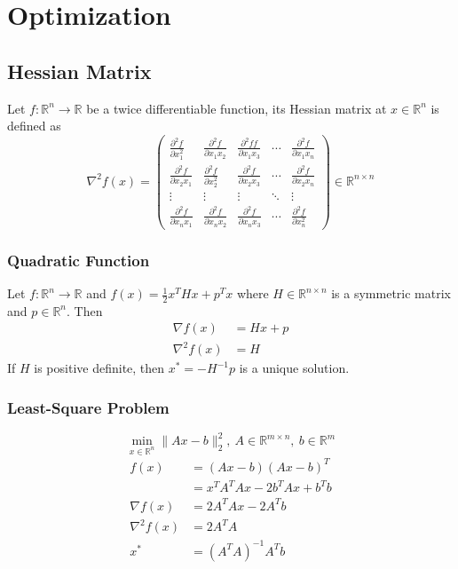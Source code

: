 \documentclass{article}
\begin{document}
    \section{Optimization}
        \subsection{Hessian Matrix}
            Let $f:\mathbb{R}^n\rightarrow\mathbb{R}$ be a twice differentiable function, its Hessian matrix at $x\in\mathbb{R}^n$ is defined as
            \[
                \nabla^2f(x)=
                \begin{pmatrix}
                    \frac{\partial^2 f}{\partial x_1^2} & \frac{\partial^2 f}{\partial x_1x_2} & \frac{\partial^2ff}{\partial x_1x_3}&\cdots&\frac{\partial^2 f}{\partial x_1x_n}\\[0.2cm]
                    \frac{\partial^2 f}{\partial x_2x_1} & \frac{\partial^2 f}{\partial x_2^2} & \frac{\partial^2 f}{\partial x_2x_3} & \cdots & \frac{\partial^2 f}{\partial x_2x_n}\\[0.2cm]
                    \vdots & \vdots &\vdots & \ddots &\vdots\\[0.2cm]
                    \frac{\partial^2 f}{\partial x_nx_1} & \frac{\partial^2 f}{\partial x_nx_2} & \frac{\partial^2 f}{\partial x_nx_3} & \cdots & \frac{\partial^2 f}{\partial x_n^2}
                \end{pmatrix}
                \in\mathbb{R}^{n \times n}
            \]
            \subsubsection{Quadratic Function}
                Let $f:\mathbb{R}^n\rightarrow\mathbb{R}$ and $f(x)=\frac{1}{2}x^THx+p^Tx$ where $H \in \mathbb{R}^{n \times n}$ is a symmetric matrix and $p \in \mathbb{R}^n$. Then
                \begin{align*}
                    \nabla f(x) &= Hx+p \\
                    \nabla^2 f(x) &= H
                \end{align*}
                If $H$ is positive definite, then $x^*=-H^{-1}p$ is a unique solution.
            
            \subsubsection{Least-Square Problem}
                \[
                    \min_{x \in \mathbb{R}^n}\|Ax - b\|_2^2,~A \in \mathbb{R}^{m \times n},~b \in \mathbb{R}^m
                \]
                \begin{align*}
                    f(x) &= (Ax - b)(Ax - b)^T \\
                         &= x^TA^TAx - 2b^TAx + b^Tb \\
                    \nabla f(x) &= 2A^TAx - 2A^Tb \\
                    \nabla^2 f(x) &= 2A^TA \\
                    x^* &= (A^TA)^{-1}A^Tb
                \end{align*}
\end{document}
